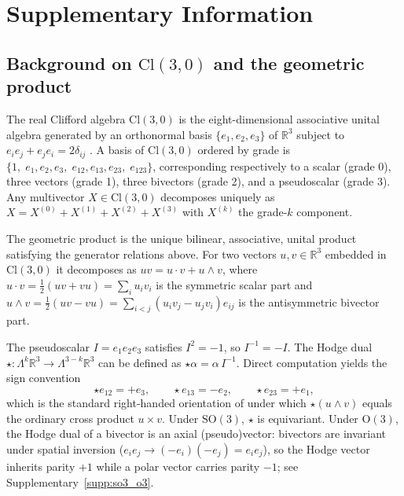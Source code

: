 \section{Supplementary Information}\label{sec:supp}


\subsection{Background on \texorpdfstring{$\mathrm{Cl}(3,0)$}{Cl(3,0)} and the geometric product}\label{supp:prelim}

The real Clifford algebra $\mathrm{Cl}(3,0)$ is the eight-dimensional associative unital algebra generated by an orthonormal basis $\{e_1, e_2, e_3\}$ of $\mathbb{R}^3$ subject to $e_ie_j + e_je_i = 2\delta_{ij}$ \citep{lounesto2001clifford,doran2003geometric}. A basis of $\mathrm{Cl}(3,0)$ ordered by grade is $\{1,\; e_1, e_2, e_3,\; e_{12}, e_{13}, e_{23},\; e_{123}\}$, corresponding respectively to a scalar (grade 0), three vectors (grade 1), three bivectors (grade 2), and a pseudoscalar (grade 3). Any multivector $X \in \mathrm{Cl}(3,0)$ decomposes uniquely as $X = X^{(0)} + X^{(1)} + X^{(2)} + X^{(3)}$ with $X^{(k)}$ the grade-$k$ component.

The geometric product is the unique bilinear, associative, unital product satisfying the generator relations above. For two vectors $u, v \in \mathbb{R}^3$ embedded in $\mathrm{Cl}(3,0)$ it decomposes as $uv = u \cdot v + u \wedge v$, where $u \cdot v = \tfrac{1}{2}(uv + vu) = \sum_i u_iv_i$ is the symmetric scalar part and $u \wedge v = \tfrac{1}{2}(uv - vu) = \sum_{i<j}(u_iv_j - u_jv_i)e_{ij}$ is the antisymmetric bivector part.

The pseudoscalar $I = e_1e_2e_3$ satisfies $I^2 = -1$, so $I^{-1} = -I$. The Hodge dual $\star: \Lambda^k\mathbb{R}^3 \to \Lambda^{3-k}\mathbb{R}^3$ can be defined as $\star\alpha = \alpha\, I^{-1}$. Direct computation yields the sign convention
\[
\star e_{12} = +e_3,\qquad \star e_{13} = -e_2,\qquad \star e_{23} = +e_1,
\]
which is the standard right-handed orientation of \citet{doran2003geometric,lounesto2001clifford} under which $\star(u\wedge v)$ equals the ordinary cross product $u\times v$. Under $\mathrm{SO}(3)$, $\star$ is equivariant. Under $\mathrm{O}(3)$, the Hodge dual of a bivector is an axial (pseudo)vector: bivectors are invariant under spatial inversion ($e_ie_j \to (-e_i)(-e_j) = e_ie_j$), so the Hodge vector inherits parity $+1$ while a polar vector carries parity $-1$; see Supplementary~\ref{supp:so3_o3}.

